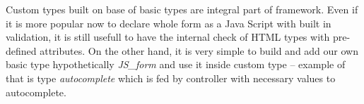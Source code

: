    Custom types built on base of basic types are integral part of framework. Even if
   it is more popular now to declare whole form as a Java Script with built in
   validation, it is still usefull to have the internal check of HTML types with
   pre-defined attributes. On the other hand, it is very simple to build and
   add our own basic type hypothetically  \textit{JS\_form} and use it inside
   custom type -- example of that is type \textit{autocomplete} which is fed
   by controller with necessary values to autocomplete. 
 

 



 


